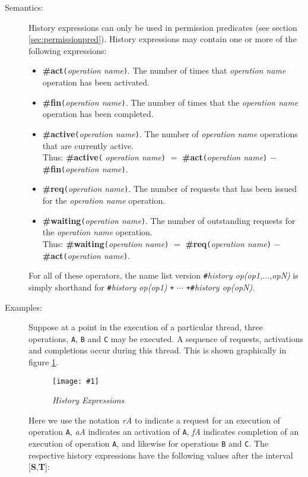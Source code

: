 \documentclass{overturerepchap}
\newcommand{\insertfig}[4]{ %
\begin{figure}[htb]
\begin{center}
\texttt{[image: \#1]}
\end{center}
\caption{{\em #3}} #4
\end{figure}
}
\begin{document}
{\begin{description}
\item[Semantics:] History expressions can only be used in
permission predicates (see section \ref{sec:permissionpred}). History
expressions may contain one or more of the following expressions:

\begin{itemize}
\item {\bf\ttfamily \#act}{\tt (}{\em operation name}{\tt )}. The number of times
  that {\em operation name} operation has been activated.
\item {\bf\ttfamily \#fin}{\tt (}{\em operation name}{\tt )}. The number of times that
  the {\em operation name} operation has been completed.
\item {\bf\ttfamily \#active}{\tt (}{\em operation name}{\tt )}. The number of {\em operation
  name} operations that are currently active. \\
 Thus: {\bf\ttfamily
  \#active}{\tt (}{\em
    operation name}{\tt )} $=$ {\bf\ttfamily \#act}{\tt (}{\em operation name}{\tt )}
  $-$ {\bf\ttfamily \#fin}{\tt (}{\em operation name}{\tt )}.
\item {\bf\ttfamily \#req}{\tt (}{\em operation name}{\tt )}. The number of requests
  that has been issued for the {\em operation name} operation.
\item {\bf\ttfamily \#waiting}{\tt (}{\em operation name}{\tt )}. The number of
  outstanding requests for the {\em operation name} operation. \\
Thus:
  {\bf\ttfamily
    \#waiting}{\tt (}{\em operation name}{\tt )} $=$ {\bf\ttfamily
    \#req}{\tt (}{\em operation
    name}{\tt )} $-$ {\bf\ttfamily \#act}{\tt (}{\em operation name}{\tt )}.
\end{itemize}
For all of these operators, the name list version
\texttt{\#}\textit{history op(op1,$\ldots$,opN)} is simply shorthand
for \texttt{\#}\textit{history op(op1)} \texttt{+} $\mathtt{\cdots}$
\texttt{+\#}\textit{history op(opN)}.

\item[Examples:]Suppose at a point in the execution of a particular
thread, three operations, \texttt{A}, \texttt{B} and \texttt{C} may be
executed. A sequence of requests, activations and completions occur
during this thread. This is shown graphically in figure \ref{historyfig}.

\insertfig{history}{14cm}{History Expressions}{\label{historyfig}}

Here we use the notation \textit{rA} to indicate a request for an
execution of operation \texttt{A}, \textit{aA} indicates an activation
of \texttt{A}, \textit{fA} indicates completion of an execution of
operation \texttt{A}, and likewise for operations \texttt{B} and
\texttt{C}. The respective history expressions have the following
values after the interval [\textbf{S},\textbf{T}]:
\end{description}

}
\end{document}
